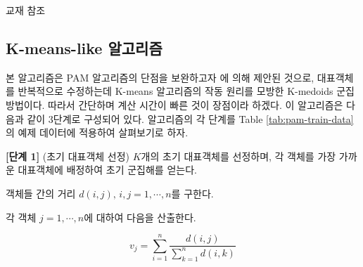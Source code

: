 \documentclass[]{book}
\newenvironment{Shaded}{\begin{snugshade}}{\end{snugshade}}
\newcommand{\DataTypeTok}[1]{\textcolor[rgb]{0.13,0.29,0.53}{#1}}
\newcommand{\DecValTok}[1]{\textcolor[rgb]{0.00,0.00,0.81}{#1}}
\newcommand{\KeywordTok}[1]{\textcolor[rgb]{0.13,0.29,0.53}{\textbf{#1}}}
\newcommand{\NormalTok}[1]{#1}
\newcommand{\OperatorTok}[1]{\textcolor[rgb]{0.81,0.36,0.00}{\textbf{#1}}}
\newcommand{\OtherTok}[1]{\textcolor[rgb]{0.56,0.35,0.01}{#1}}
\newcommand{\StringTok}[1]{\textcolor[rgb]{0.31,0.60,0.02}{#1}}
\begin{document}
교재 \citep{jun2012datamining} 참조

\hypertarget{kmeans-like}{%
\subsection{K-means-like 알고리즘}\label{kmeans-like}}

본 알고리즘은 PAM 알고리즘의 단점을 보완하고자 \citet{park2009simple} 에 의해 제안된 것으로, 대표객체를 반복적으로 수정하는데 K-means 알고리즘의 작동 원리를 모방한 K-medoids 군집 방법이다. 따라서 간단하며 계산 시간이 빠른 것이 장점이라 하겠다. 이 알고리즘은 다음과 같이 3단계로 구성되어 있다. 알고리즘의 각 단계를 Table \ref{tab:pam-train-data}의 예제 데이터에 적용하여 살펴보기로 하자.

\textbf{{[}단계 1{]}} (초기 대표객체 선정) \(K\)개의 초기 대표객체를 선정하며, 각 객체를 가장 가까운 대표객체에 배정하여 초기 군집해를 얻는다.

객체들 간의 거리 \(d(i, j), \, i, j = 1, \cdots, n\)를 구한다.

\begin{Shaded}
\end{Shaded}

각 객체 \(j = 1, \cdots, n\)에 대하여 다음을 산출한다.

\begin{equation*}
v_j = \sum_{i = 1}^{n} \frac{d(i, j)}{\sum_{k = 1}^{n} d(i, k)}
\end{equation*}

\begin{Shaded}
\end{Shaded}
\end{document}
